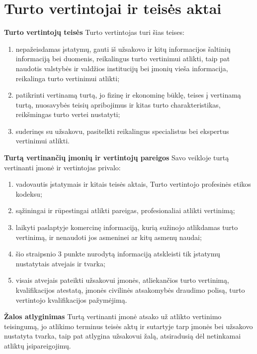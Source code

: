 \section{Turto vertintojai ir teisės aktai}


\textbf{Turto vertintojų teisės}
Turto vertintojas turi šias teises:
\begin{enumerate}
    \item nepažeisdamas įstatymų, gauti iš užsakovo ir kitų informacijos šaltinių informaciją bei duomenis, reikalingus turto vertinimui atlikti, taip pat naudotis valstybės ir valdžios institucijų bei įmonių vieša informacija, reikalinga turto vertinimui atlikti;
    \item patikrinti vertinamą turtą, jo fizinę ir ekonominę būklę, teises į vertinamą turtą, nuosavybės teisių apribojimus ir kitas turto charakteristikas, reikšmingas turto vertei nustatyti;
    \item suderinęs su užsakovu, pasitelkti reikalingus specialistus bei ekspertus vertinimui atlikti.
\end{enumerate}



\textbf{Turtą vertinančių įmonių ir vertintojų pareigos}
Savo veikloje turtą vertinanti įmonė ir vertintojas privalo:   
\begin{enumerate}
    \item vadovautis įstatymais ir kitais teisės aktais, Turto vertintojo profesinės etikos kodeksu;
    \item sąžiningai ir rūpestingai atlikti pareigas, profesionaliai atlikti vertinimą;
    \item laikyti paslaptyje komercinę informaciją, kurią sužinojo atlikdamas turto vertinimą, ir nenaudoti jos asmeninei ar kitų asmenų naudai;
    \item šio straipsnio 3 punkte nurodytą informaciją atskleisti tik įstatymų nustatytais atvejais ir tvarka;
    \item visais atvejais pateikti užsakovui įmonės, atliekančios turto vertinimą, kvalifikacijos atestatą, įmonės civilinės atsakomybės draudimo polisą, turto vertintojo kvalifikacijos pažymėjimą.
\end{enumerate}



\textbf{Žalos atlyginimas}
Turtą vertinanti įmonė atsako už atlikto vertinimo teisingumą, jo atlikimo terminus teisės aktų ir sutartyje tarp įmonės bei užsakovo nustatyta tvarka, taip pat atlygina užsakovui žalą, atsiradusią dėl netinkamai atliktų įsipareigojimų.



